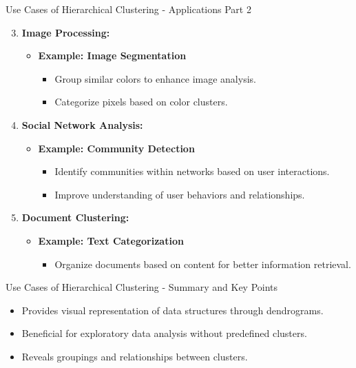 \documentclass[aspectratio=169]{beamer}
\begin{document}
\begin{frame}[fragile]{Use Cases of Hierarchical Clustering - Applications Part 2}
    \begin{enumerate}
        \setcounter{enumi}{2} %
        \item \textbf{Image Processing:}
            \begin{itemize}
                \item \textbf{Example: Image Segmentation}
                \begin{itemize}
                    \item Group similar colors to enhance image analysis.
                    \item Categorize pixels based on color clusters.
                \end{itemize}
            \end{itemize}
        \item \textbf{Social Network Analysis:}
            \begin{itemize}
                \item \textbf{Example: Community Detection}
                \begin{itemize}
                    \item Identify communities within networks based on user interactions.
                    \item Improve understanding of user behaviors and relationships.
                \end{itemize}
            \end{itemize}
        \item \textbf{Document Clustering:}
            \begin{itemize}
                \item \textbf{Example: Text Categorization}
                \begin{itemize}
                    \item Organize documents based on content for better information retrieval.
                \end{itemize}
            \end{itemize}
    \end{enumerate}
\end{frame}

\begin{frame}[fragile]{Use Cases of Hierarchical Clustering - Summary and Key Points}
    \begin{itemize}
        \item Provides visual representation of data structures through dendrograms.
        \item Beneficial for exploratory data analysis without predefined clusters.
        \item Reveals groupings and relationships between clusters.
    \end{itemize}
\end{frame}
\end{document}
